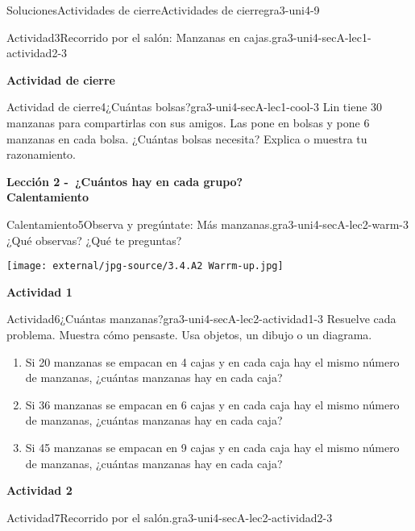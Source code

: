 \documentclass[twoside,10pt,]{article}
\begin{document}
\begin{solutions-section}{Soluciones}{Actividades de cierre}{}{Actividades de cierre}{}{}{gra3-uni4-9}
\begin{activitysolution}{Actividad}{3}{Recorrido por el salón: Manzanas en cajas.}{gra3-uni4-secA-lec1-actividad2-3}
\begin{enumerate}
\end{enumerate}
%
\end{activitysolution}%
\par\medskip
\noindent\textbf{\large{}\space\textperiodcentered\space{}Actividad de cierre}
\begin{projectsolution}{Actividad de cierre}{4}{¿Cuántas bolsas?}{gra3-uni4-secA-lec1-cool-3}%
Lin tiene 30 manzanas para compartirlas con sus amigos. Las pone en bolsas y pone 6 manzanas en cada bolsa. ¿Cuántas bolsas necesita? Explica o muestra tu razonamiento.%
\end{projectsolution}%
\par\medskip
\noindent\textbf{\large{}\space\textperiodcentered\space{}Lección 2 -~¿Cuántos hay en cada grupo?\\
\space\textperiodcentered\space{}Calentamiento}
\begin{explorationsolution}{Calentamiento}{5}{Observa y pregúntate: Más manzanas.}{gra3-uni4-secA-lec2-warm-3}%
¿Qué observas? ¿Qué te preguntas?%
\begin{image}{0}{1}{0}{}%
\texttt{[image: external/jpg-source/3.4.A2 Warrm-up.jpg]}
\end{image}%
\end{explorationsolution}%
\par\medskip
\noindent\textbf{\large{}\space\textperiodcentered\space{}Actividad 1}
\begin{activitysolution}{Actividad}{6}{¿Cuántas manzanas?}{gra3-uni4-secA-lec2-actividad1-3}%
Resuelve cada problema. Muestra cómo pensaste. Usa objetos, un dibujo o un diagrama.%
\par
%
\begin{enumerate}
\item{}Si 20 manzanas se empacan en 4 cajas y en cada caja hay el mismo número de manzanas, ¿cuántas manzanas hay en cada caja?%
\item{}Si 36 manzanas se empacan en 6 cajas y en cada caja hay el mismo número de manzanas, ¿cuántas manzanas hay en cada caja?%
\item{}Si 45 manzanas se empacan en 9 cajas y en cada caja hay el mismo número de manzanas, ¿cuántas manzanas hay en cada caja?%
\end{enumerate}
%
\end{activitysolution}%
\par\medskip
\noindent\textbf{\large{}\space\textperiodcentered\space{}Actividad 2}
\begin{activitysolution}{Actividad}{7}{Recorrido por el salón.}{gra3-uni4-secA-lec2-actividad2-3}%

\end{activitysolution}
\end{solutions-section}
\end{document}
